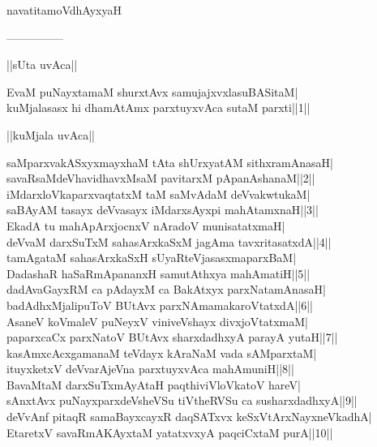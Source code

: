 \documentclass{article}
\begin{document}
\begin{center}
navatitamoVdhAyxyaH
\end{center}

\begin{center}
---------------
\end{center}

\begin{center}
||sUta uvAca||
\end{center}

EvaM puNayxtamaM shurxtAvx samujajxvxlasuBASitaM|\\
kuMjalasasx hi dhamAtAmx parxtuyxvAca sutaM  parxti||1||\\

\begin{center}
||kuMjala uvAca||
\end{center}

saMparxvakASxyxmayxhaM tAta shUrxyatAM sithxramAnasaH|\\
savaRsaMdeVhavidhavxMsaM pavitarxM pApanAshanaM||2||\\
iMdarxloVkaparxvaqtatxM taM  saMvAdaM deVvakwtukaM|\\
saBAyAM tasayx deVvasayx iMdarxsAyxpi mahAtamxnaH||3||\\
EkadA tu mahApArxjocnxV nAradoV munisatatxmaH|\\
deVvaM darxSuTxM sahasArxkaSxM jagAma tavxritasatxdA||4||\\
tamAgataM sahasArxkaSxH sUyaRteVjasasxmaparxBaM|\\
DadashaR haSaRmApananxH samutAthxya mahAmatiH||5||\\
dadAvaGayxRM ca pAdayxM ca BakAtxyx parxNatamAnasaH|\\
badAdhxMjalipuToV BUtAvx parxNAmamakaroVtatxdA||6||\\
AsaneV koVmaleV puNeyxV viniveVshayx divxjoVtatxmaM|\\
paparxcaCx parxNatoV BUtAvx sharxdadhxyA parayA yutaH||7||\\
kasAmxcAcxgamanaM teVdayx kAraNaM vada sAMparxtaM|\\
ituyxketxV deVvarAjeVna parxtuyxvAca mahAmuniH||8||\\
BavaMtaM darxSuTxmAyAtaH paqthiviVloVkatoV hareV|\\
sAnxtAvx puNayxparxdeVsheVSu tiVtheRVSu ca susharxdadhxyA||9||\\
deVvAnf pitaqR samaBayxcayxR daqSATxvx keSxVtArxNayxneVkadhA|\\
EtaretxV savaRmAKAyxtaM yatatxvxyA paqciCxtaM purA||10||\\
\end{document}
